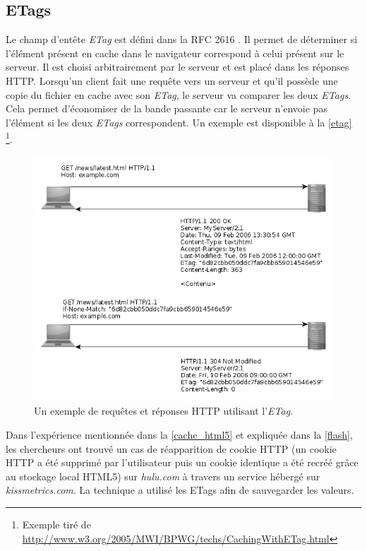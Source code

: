 \subsection{ETags}
\label{cache_etags}
Le champ d'entête \textit{ETag} est défini dans la RFC 2616 \cite{IETF_RFC2616}. Il permet de déterminer si l'élément présent en cache dans le navigateur correspond à celui présent sur le serveur. Il est choisi arbitrairement par le serveur et est placé dans les réponses HTTP. Lorsqu'un client fait une requête vers un serveur et qu'il possède une copie du fichier en cache avec son \textit{ETag}, le serveur va comparer les deux \textit{ETags}. Cela permet d'économiser de la bande passante car le serveur n'envoie pas l'élément si les deux \textit{ETags} correspondent. Un exemple est disponible à la \autoref{etag} \footnote{Exemple tiré de \url{http://www.w3.org/2005/MWI/BPWG/techs/CachingWithETag.html}}.
\begin{figure}[h]
	\centering
	\includegraphics[scale=0.8]{figures/ETag_NB.png}
	\caption{\label{etag}Un exemple de requêtes et réponses HTTP utilisant l'\textit{ETag}.}
\end{figure}
\newline

Dans l'expérience mentionnée dans la \autoref{cache_html5} et expliquée dans la \autoref{flash}, les chercheurs ont trouvé un cas de réapparition de cookie HTTP (un cookie HTTP a été supprimé par l'utilisateur puis un cookie identique a été recréé grâce au stockage local HTML5) sur \textit{hulu.com} à travers un service hébergé sur \textit{kissmetrics.com}. La technique a utilisé les ETags afin de sauvegarder les valeurs.
\newline


